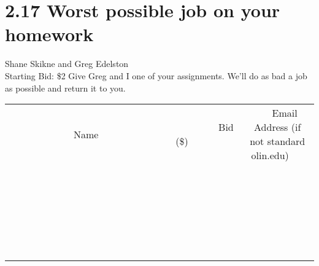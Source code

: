 \documentclass[11pt]{article}
\begin{document}
\section*{2.17 Worst possible job on your homework}
Shane Skikne and Greg Edelston
\\
Starting Bid: \$2
\newline
Give Greg and I one of your assignments. We'll do as bad a job as possible and return it to you.
\\[6ex]
\begin{tabular}{c c c}
~~~~~~~~~~~~~Name~~~~~~~~~~~~~ & ~~~~~~~~~Bid (\$)~~~~~~~~~  & ~~~Email Address (if not standard olin.edu)~~~\\
 & & \\
\hline
 & & \\
\hline
 & & \\
\hline
 & & \\
\hline
 & & \\
\hline
 & & \\
\hline
 & & \\
\hline
 & & \\
\hline
 & & \\
\hline
 & & \\
\hline
 & & \\
\hline
 & & \\
\hline
 & & \\
\hline
 & & \\
\hline
 & & \\
\hline
 & & \\
\hline
 & & \\
\hline
 & & \\
\hline
 & & \\
\hline
 & & \\
\hline
 & & \\
\hline
 & & \\
\hline
 & & \\
\hline
 & & \\
\hline
 & & \\
\hline
 & & \\
\hline
\end{tabular}
\newpage
\end{document}
